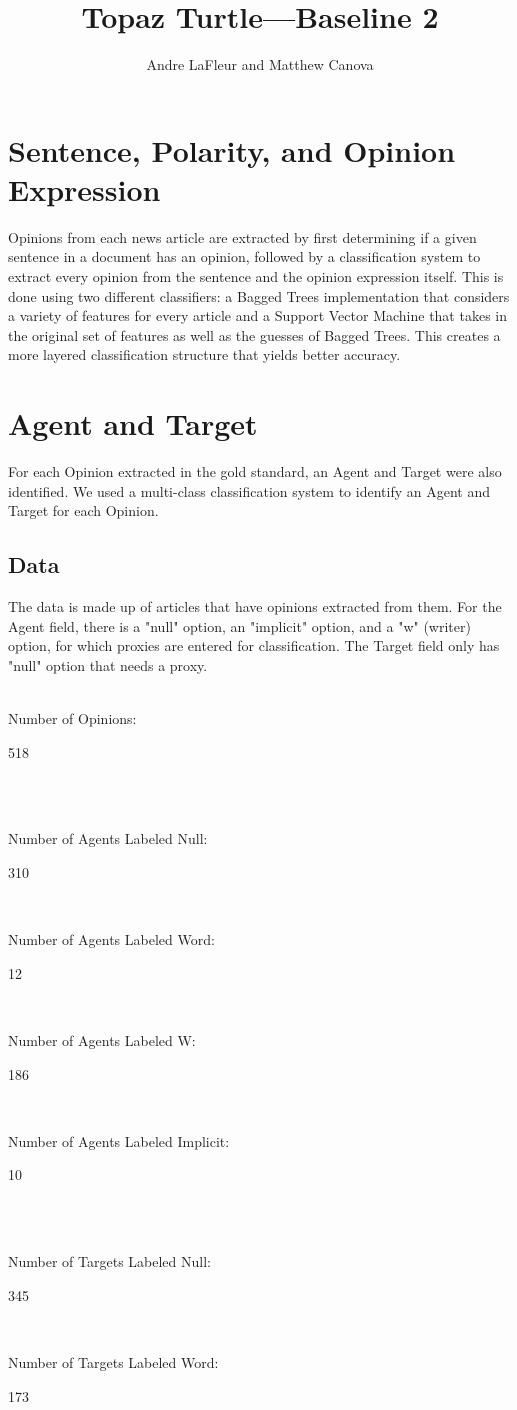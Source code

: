 \documentclass{article}
\title{Topaz Turtle---Baseline 2}
\author{Andre LaFleur and Matthew Canova}
\newcommand\textbox[1]{%
  \parbox{.4\textwidth}{#1}%
}
\begin{document}
    \maketitle

        \section{Sentence, Polarity, and Opinion Expression}

        Opinions from each news article are extracted by first determining if a given sentence in a document has an opinion, followed by a classification
    system to extract every opinion from the sentence and the opinion expression itself. This is done using two different classifiers: a Bagged Trees implementation
    that considers a variety of features for every article and a Support Vector Machine that takes in the original set of features as well as the guesses of Bagged Trees.
    This creates a more layered classification structure that yields better accuracy.

     
       \section{Agent and Target}
       
       For each Opinion extracted in the gold standard, an Agent and Target were also identified. We used a multi-class classification system to identify an Agent and Target for each Opinion.

       \subsection{Data}
       
       The data is made up of articles that have opinions extracted from them. For the Agent field, there is a "null" option, an "implicit" option, and a "w" (writer) option, for which proxies are entered for classification. The Target field only has "null" option that needs a proxy. \\ \\
\textbox{Number of Opinions:\hfil}  	                \textbox{\hfil 518\hfil} \\\\
\textbox{Number of Agents Labeled Null:\hfil}  \textbox{\hfil 310\hfil}	\\
\textbox{Number of Agents Labeled Word:\hfil} 	\textbox{\hfil 12\hfil}\\
\textbox{Number of Agents Labeled W:\hfil} 	\textbox{\hfil 186\hfil}\\
\textbox{Number of Agents Labeled Implicit:\hfil} 	\textbox{\hfil 10\hfil}\\\\
\textbox{Number of Targets Labeled Null:\hfil} \textbox{\hfil 345\hfil}\\	
\textbox{Number of Targets Labeled Word:\hfil}  \textbox{\hfil 173\hfil}
            
\end{document}
